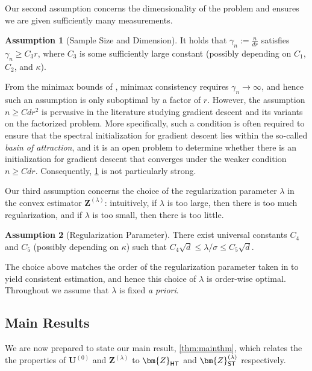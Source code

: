 \documentclass[10pt]{article}
\theoremstyle{definition}
\newtheorem{assumption}{Assumption}
\begin{document}
Our second assumption concerns the dimensionality of the problem and ensures we are given sufficiently many measurements.
\begin{assumption}[Sample Size and Dimension] \label{ass2}
It holds that $\gamma_n := \frac{n}{dr}$ satisfies $\gamma_n \geq C_3 r $, where $C_3$ is some sufficiently large constant (possibly depending on $C_1$,  $C_2$, and $\kappa$). %
\end{assumption}
From the minimax bounds of \citet{candes_tight_2011}, minimax consistency requires $\gamma_n \to \infty$, and hence such an assumption is only suboptimal by a factor of $r$.  However, the assumption $n \geq C d r^2$ is pervasive in the literature studying gradient descent and its variants on the factorized problem.  More specifically, such a condition is often required to ensure that the spectral initialization for gradient descent lies within the so-called \emph{basin of attraction}, and it is an open problem to determine whether there is an initialization for gradient descent that converges under the weaker condition $n \geq C d r$. Consequently, \cref{ass2} is not particularly strong.     


Our third assumption concerns the choice of the regularization parameter $\lambda$ in the convex estimator $\bm{Z}^{(\lambda)}$:
intuitively, if $\lambda$ is too large, then there is too much regularization, and if $\lambda$ is too small, then there is too little.  
\begin{assumption}[Regularization Parameter] \label{ass3}
    There exist universal constants $C_4$ and $C_5$ (possibly depending on $\kappa$) such that $C_4\sqrt{d} \leq \lambda/\sigma \leq C_5 \sqrt{d}$.  
\end{assumption}
 The choice above matches the order of the regularization parameter taken in \citet{candes_tight_2011} to yield consistent estimation, and hence this choice of $\lambda$ is order-wise optimal.  Throughout we assume that $\lambda$ is fixed \emph{a priori}.  


\subsection{Main Results}
We are now prepared to state our main result, \cref{thm:mainthm}, which relates the the properties of $\bm{U}^{(0)}$ and $\bm{Z}^{(\lambda)}$ to $\bm{Z}_{{\sf HT}}$ and $\bm{Z}_{{\sf ST}}^{(\lambda)}$ respectively.  
\end{document}
